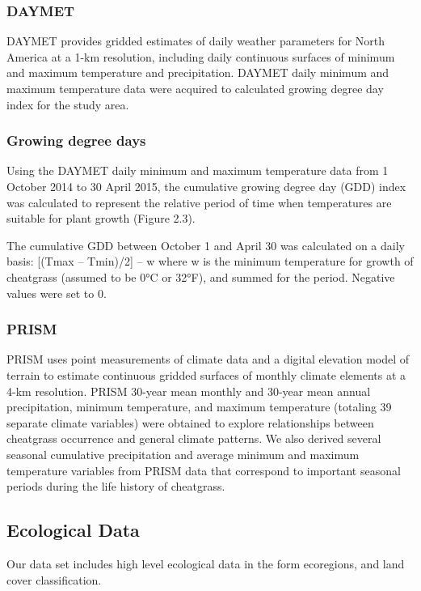 \def\year{2017}\relax \documentclass[letterpaper]{article}
\begin{document}
\subsubsection{DAYMET}
DAYMET provides gridded estimates of daily weather parameters for North America at a 1-km resolution, including daily continuous surfaces of minimum and maximum temperature and precipitation.
DAYMET daily minimum and maximum temperature data were acquired to calculated growing degree day index for the study area.
\subsubsection{Growing degree days}
Using the DAYMET daily minimum and maximum temperature data from 1 October 2014 to 30 April 2015, the cumulative growing degree day (GDD) index was calculated to represent the relative period of time when temperatures are suitable for plant growth (Figure 2.3). 
 
The cumulative GDD between October 1 and April 30 was calculated on a daily basis:
[(Tmax – Tmin)/2] – w
where w is the minimum temperature for growth of cheatgrass (assumed to be 0°C or 32°F), and summed for the period. Negative values were set to 0.

\subsubsection{PRISM}
PRISM uses point measurements of climate data and a digital elevation model of terrain to estimate continuous gridded surfaces of monthly climate elements at a 4-km resolution.  PRISM 30-year mean monthly and 30-year mean annual precipitation, minimum temperature, and maximum temperature (totaling 39 separate climate variables) were obtained to explore relationships between cheatgrass occurrence and general climate patterns. We also derived several seasonal cumulative precipitation and average minimum and maximum temperature variables from PRISM data that correspond to important seasonal periods during the life history of cheatgrass. 

\subsection{Ecological Data}
Our data set includes high level ecological data in the form  ecoregions, and land cover classification. 
\end{document}
